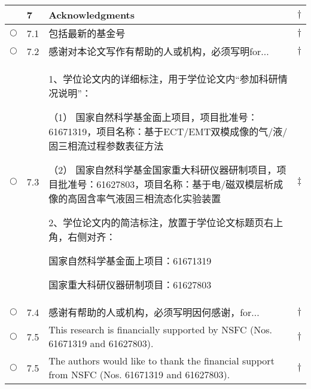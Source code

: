 \documentclass{ctexart}
\begin{document}
\begin{center}
\begin{longtable}{|l|l|p{}|l|}
 & 7 & \textcolor[rgb]{0.00,0.00,1.00}{\textbf{Acknowledgments}}& $\dagger$\\\hline
$\bigcirc$& 7.1 & 包括最新的基金号 & $\dagger$\\\hline
$\bigcirc$& 7.2 & 感谢对本论文写作有帮助的人或机构，必须写明for... & $\dagger$\\\hline
$\bigcirc$& 7.3 & 1、学位论文内的详细标注，用于学位论文内“参加科研情况说明”：

（1）	国家自然科学基金面上项目，项目批准号：61671319，项目名称：基于ECT/EMT双模成像的气/液/固三相流过程参数表征方法

（2）	国家自然科学基金国家重大科研仪器研制项目，项目批准号：61627803，项目名称：基于电/磁双模层析成像的高固含率气液固三相流态化实验装置

2、学位论文内的简洁标注，放置于学位论文标题页右上角，右侧对齐：

国家自然科学基金面上项目：61671319

国家重大科研仪器研制项目：61627803 & $\ddagger$\\\hline
$\bigcirc$& 7.4 & 感谢有帮助的人或机构，必须写明因何感谢，for... & $\dagger$\\\hline
$\bigcirc$& 7.5 & This research is financially supported by NSFC (Nos. 61671319 and 61627803).  & $\dagger$\\\hline
$\bigcirc$& 7.5 & The authors would like to thank the financial support from NSFC (Nos. 61671319 and 61627803).  & $\dagger$\\\hline
\hline


\end{longtable}
\end{center}
\end{document}
